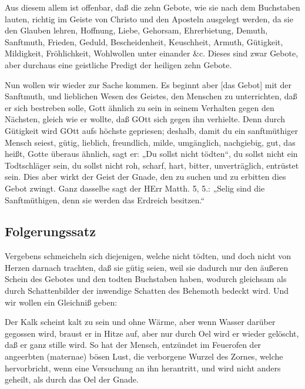 Aus diesem allem ist offenbar, daß die zehn Gebote, wie sie nach dem Buchstaben lauten, richtig im Geiste von Christo und den Aposteln ausgelegt werden, da sie den Glauben lehren, Hoffnung, Liebe, Gehorsam, Ehrerbietung, Demuth, Sanftmuth, Frieden, Geduld, Bescheidenheit, Keuschheit, Armuth, Gütigkeit, Mildigkeit, Fröhlichkeit, Wohlwollen unter einander \&c. Dieses sind zwar Gebote, aber durchaus eine geistliche Predigt der heiligen zehn Gebote.

Nun wollen wir wieder zur Sache kommen. Es beginnt aber [das Gebot] mit der Sanftmuth, und lieblichen Wesen des Geistes, den Menschen zu unterrichten, daß er sich bestreben solle, Gott ähnlich zu sein in seinem Verhalten gegen den Nächsten, gleich wie er wollte, daß GOtt sich gegen ihn verhielte. Denn durch Gütigkeit wird GOtt aufs höchste gepriesen; deshalb, damit du ein sanftmüthiger Mensch seiest, gütig, lieblich, freundlich, milde, umgänglich, nachgiebig, gut, das heißt, Gotte überaus ähnlich, sagt er: „Du sollst nicht tödten“, du sollst nicht ein Todtschläger sein, du sollst nicht roh, scharf, hart, bitter, unverträglich, entrüstet sein. Dies aber wirkt der Geist der Gnade, den zu suchen und zu erbitten dies Gebot zwingt. Ganz dasselbe sagt der HErr Matth. 5, 5.: „Selig sind die Sanftmüthigen, denn sie werden das Erdreich besitzen.“

\subsection{Folgerungssatz}

Vergebens schmeicheln sich diejenigen, welche nicht tödten, und doch nicht von Herzen darnach trachten, daß sie gütig seien, weil sie dadurch nur den äußeren Schein des Gebotes und den todten Buchstaben haben, wodurch gleichsam als durch Schattenbilder der inwendige Schatten
des Behemoth bedeckt wird. Und wir wollen ein Gleichniß geben:

Der Kalk scheint kalt zu sein und ohne Wärme, aber wenn Wasser darüber gegossen wird, braust er in Hitze auf, aber nur durch Oel wird er wieder gelöscht, daß er ganz stille wird. So hat der Mensch, entzündet im Feuerofen der angeerbten (maternae) bösen Lust, die verborgene Wurzel des Zornes, welche hervorbricht, wenn eine Versuchung an ihn herantritt, und wird nicht anders geheilt, als durch das Oel der Gnade.

